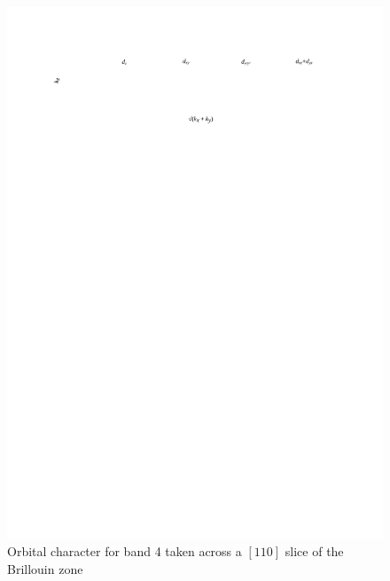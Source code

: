 \begin{figure}[h!]
    \begin{center}
        \includegraphics[scale=0.7]{Chapter-dHvABaFe2P2/Figures/AngleDepMeasurements/BandCharacterPlot/Band4_110Slice_BandCharacter}
        \caption{Orbital character for band 4 taken across a $[110]$ slice of the Brillouin zone}
        \label{Fig:Appendix:BandCharacter110Band4}
    \end{center}
\end{figure}
